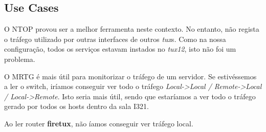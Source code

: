 \subsection{Use Cases}
O NTOP provou ser a melhor ferramenta neste contexto. No entanto, não regista o tráfego utilizado por outras interfaces de outros \textit{tux}s.
Como na nossa configuração, todos os serviços estavam instados no \textit{tux12}, isto não foi um problema.

O MRTG é mais útil para monitorizar o tráfego de um servidor. Se estivéssemos a ler o switch, iríamos conseguir ver todo o tráfego \textit{Local->Local / Remote->Local / Local->Remote}.
Isto seria mais útil, sendo que estaríamos a ver todo o tráfego gerado por todos os hosts dentro da sala I321.

Ao ler router \textbf{firetux}, não íamos conseguir ver tráfego local.


